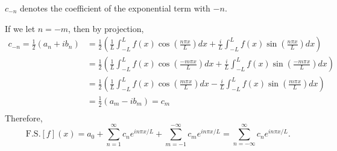 \documentclass[class=article,crop=false]{standalone}
\begin{document}
\begin{notation}
$c_{-n}$ denotes the coefficient of the exponential term with $-n$.
\end{notation}
If we let $ n=-m$, then by projection,
\begin{align*}
	c_{-n}=\frac{1}{2}(a_n+ib_n) &= \frac{1}{2} \left( \frac{1}{L}\int_{-L}^{L} f(x) \cos \left( \frac{ n\pi x}{ L} \right) dx + \frac{i}{L} \int_{-L}^{L} f(x) \sin \left( \frac{ n\pi x}{ L} \right) dx  \right)  \\
				     &= \frac{1}{2} \left( \frac{1}{L} \int_{-L}^{L} f(x) \cos \left( \frac{ -m \pi x}{ L} \right) dx + \frac{i}{L} \int_{-L}^{L} f(x) \sin \left( \frac{ -m\pi x}{ L} \right) dx  \right)  \\
				     &=  \frac{1}{2} \left( \frac{1}{L} \int_{-L}^{L} f(x) \cos \left( \frac{ m \pi x}{ L} \right) dx - \frac{i}{L} \int_{-L}^{L} f(x) \sin \left( \frac{ m\pi x}{ L} \right) dx  \right)   \\
				     &= \frac{1}{2} (a_m-ib_m) = c_m \\
\end{align*}
Therefore, 
\[
\text{ F.S.} [ f]( x) = a_0+ \sum_{ n= 1}^{\infty} c_n e^{   i n\pi x / L} + \sum_{ m= -1}^{-\infty} c_m e^{   i n\pi x / L} =\sum_{ n= -\infty}^{\infty} c_n e^{   i n\pi x / L} 
.\] 
\end{document}
